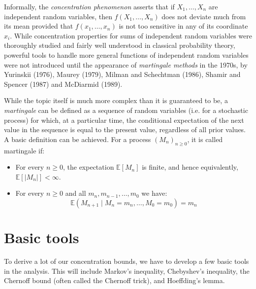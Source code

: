 Informally, the \textit{concentration phenomenon} asserts that if $X_{1},\dots,X_{n}$ are independent random variables, then $f(X_{1},\dots,X_{n})$ does not deviate much from its mean provided that $f(x_{1},\dots,x_{n})$ is not too sensitive in any of its coordinate $x_{i}$. While concentration properties for sums of independent random variables were thoroughly studied and fairly well understood in classical probability theory, powerful tools to handle more general functions of independent random variables were not introduced until the appearance of \textit{martingale methods} in the 1970s, by Yurinskii (1976), Maurey (1979), Milman and Schechtman (1986), Shamir and Spencer (1987) and McDiarmid (1989). 
\begin{note}
    While the topic itself is much more complex than it is guaranteed to be, a \textit{martingale} can be defined as a sequence of random variables (i.e. for a stochastic process) for which, at a particular time, the conditional expectation of the next value in the sequence is equal to the present value, regardless of all prior values. A basic definition can be achieved. For a process $(M_n)_{n\geq 0}$, it is called martingale if:
    \begin{itemize}[noitemsep,topsep=1pt]
        \item For every $n\geq 0$, the expectation $\mathbb{E}[M_n]$ is finite, and hence equivalently, $\mathbb{E}[\lvert M_n \rvert]< \infty$.
        \item For every $n\geq 0$ and all $m_{n},m_{n-1},\dots,m_{0}$ we have: \begin{equation}
            \mathbb{E}(M_{n+1}\mid M_n = m_{n},\dots, M_{0}=m_{0}) = m_{n}
        \end{equation}
    \end{itemize} 
\end{note}

\section{Basic tools}
To derive a lot of our concentration bounds, we have to develop a few basic tools in the analysis. This will include Markov's inequality, Chebyshev's inequality, the Chernoff bound (often called the Chernoff trick), and Hoeffding's lemma. 
